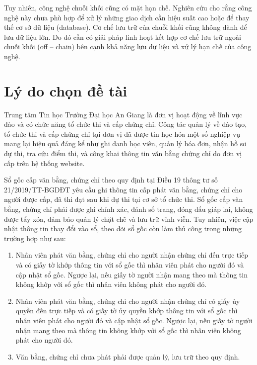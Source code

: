 Tuy nhiên, công nghệ chuỗi khối cũng có mặt hạn chế.
Nghiên cứu \cite{CHEN20191122} cho rằng công nghệ này chưa phù hợp để xử lý những giao dịch cần hiệu suất cao hoặc để thay thế cơ sở dữ liệu (database).
Cơ chế lưu trữ của chuỗi khối cũng không dành để lưu dữ liệu lớn.
Do đó cần có giải pháp linh hoạt kết hợp cơ chế lưu trữ ngoài chuỗi khối (off -- chain) bên cạnh khả năng lưu dữ liệu và xử lý hạn chế của công nghệ.

\section{Lý do chọn đề tài}

Trung tâm Tin học Trường Đại học An Giang là đơn vị hoạt động về lĩnh vực đào và có chức năng tổ chức thi và cấp chứng chỉ.
Công tác quản lý về đào tạo, tổ chức thi và cấp chứng chỉ tại đơn vị đã được tin học hóa một số nghiệp vụ mang lại hiệu quả đáng kể như ghi danh học viên, quản lý hóa đơn, nhận hồ sơ dự thi, tra cứu điểm thi, và công khai thông tin văn bằng chứng chỉ do đơn vị cấp trên hệ thống website.

Sổ gốc cấp văn bằng, chứng chỉ theo quy định tại Điều 19 thông tư số 21/2019/TT-BGDĐT yêu cầu ghi thông tin cấp phát văn bằng, chứng chỉ cho người được cấp, đã thi đạt sau khi dự thi tại cơ sở tổ chức thi. Sổ gốc cấp văn bằng, chứng chỉ phải được ghi chính xác, đánh số trang, đóng dấu giáp lai, không được tẩy xóa, đảm bảo quản lý chặt chẽ và lưu trữ vĩnh viễn. Tuy nhiên, việc cập nhật thông tin thay đổi vào sổ, theo dõi sổ gốc còn làm thủ công trong những trường hợp như sau:

\begin{enumerate}
\item Nhân viên phát văn bằng, chứng chỉ cho người nhận chứng chỉ đến trực tiếp và có giấy tờ khớp thông tin với sổ gốc thì nhân viên phát cho người đó và cập nhật sổ gốc. Ngược lại, nếu giấy tờ người nhận mang theo mà thông tin không khớp với sổ gốc thì nhân viên không phát cho người đó.

\item Nhân viên phát văn bằng, chứng chỉ cho người nhận chứng chỉ có giấy ủy quyền đến trực tiếp và có giấy tờ ủy quyền khớp thông tin với sổ gốc thì nhân viên phát cho người đó và cập nhật sổ gốc. Ngược lại, nếu giấy tờ người nhận mang theo mà thông tin không khớp với sổ gốc thì nhân viên không phát cho người đó.

\item Văn bằng, chứng chỉ chưa phát phải được quản lý, lưu trữ theo quy định.
\end{enumerate}

